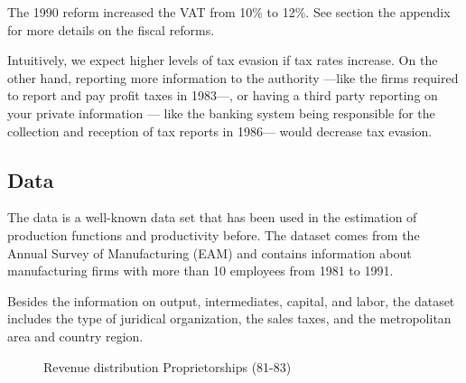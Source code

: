 \documentclass[
  12pt]{article}
\theoremstyle{definition}
\theoremstyle{remark}
\begin{document}
The 1990 reform increased the VAT from 10\% to 12\%. See section the
appendix for more details on the fiscal reforms.

Intuitively, we expect higher levels of tax evasion if tax rates
increase. On the other hand, reporting more information to the authority
---like the firms required to report and pay profit taxes in 1983---, or
having a third party reporting on your private information --- like the
banking system being responsible for the collection and reception of tax
reports in 1986--- would decrease tax evasion.

\subsection{Data}\label{data}

The data is a well-known data set that has been used in the estimation
of production functions and productivity before. The dataset comes from
the Annual Survey of Manufacturing (EAM) and contains information about
manufacturing firms with more than 10 employees from 1981 to 1991.

Besides the information on output, intermediates, capital, and labor,
the dataset includes the type of juridical organization, the sales
taxes, and the metropolitan area and country region.

\begin{figure}

\caption{\label{fig-revenue-hist-bunch-0}Revenue distribution
Proprietorships (81-83)}


\end{figure}%
\end{document}
